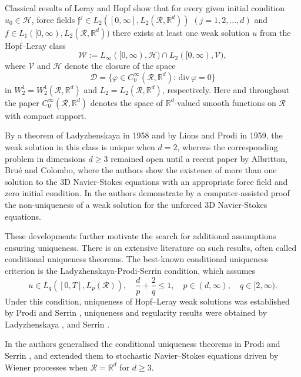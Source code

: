\documentclass[11pt,reqno]{amsart}
\theoremstyle{definition}
\theoremstyle{remark}
\newcommand\bR{\mathbb{R}}
\newcommand\frf{\mathfrak{f}}
\newcommand\cD{\mathcal{D}}
\newcommand\cH{\mathcal{H}}
\newcommand\cR{\mathcal{R}}
\newcommand{\<}{\langle}
\renewcommand{\>}{\rangle}
\newcommand{\R}{\mathbb{R}}
\begin{document}
Classical results of Leray \cite{L1934} and Hopf \cite{H1951} show that for
every given initial condition $u_0\in\mathcal H$, force fields 
$\frf^j\in L_2([0,\infty],L_2(\cR,\bR^d))$ $(j=1,2,...,d)$ and 
$f\in L_1([0,\infty),L_2(\cR,\bR^d))$ there exists at least one weak
solution $u$ from  the Hopf--Leray class
$$
\mathcal W:=L_{\infty}([0,\infty),\mathcal H)
\cap L_2([0,\infty),\mathcal V),
$$
where
$\mathcal V$ and $\cH$ denote the closure of the space 
$$
\cD=\{\varphi\in C^{\infty}_0(\cR,\bR^d): \,\text{div$\,\varphi=0$}\}
$$
in $W^1_2=W^1_2(\cR,\bR^d)$ and $L_2=L_2(\cR,\bR^d)$, respectively. 
Here and throughout the paper  $C^{\infty}_0(\cR,\bR^d)$ denotes the space of $\R^d$-valued 
smooth functions on $\cR$ with compact support. 

By a theorem of Ladyzhenskaya \cite{L1958} in 1958 
and by Lions and Prodi \cite{LionsProdi1959} in 1959,  
the weak solution in this class is unique when
$d=2$,  whereas the corresponding problem in dimensions 
$d\ge3$ remained open until a recent paper \cite{ABC} by  
Albritton, Bru\'e and Colombo,  
 where the authors show the existence of more than one solution 
to the 3D Navier-Stokes equations with an appropriate force field 
and zero initial condition.  In \cite{HouWangYang2026} 
the authors demonstrate by a computer-assisted 
proof the non-uniqueness of a weak solution 
for the unforced  3D Navier-Stokes equations. 

These developments further motivate the search 
for additional assumptions ensuring uniqueness.
There is an extensive literature 
on such results, often called conditional uniqueness theorems. 
The best-known conditional uniqueness criterion 
is the Ladyzhenskaya-Prodi-Serrin condition, which assumes
\begin{equation}
                                                                                       \label{conditionLPS}
u\in L_q([0,T], L_p(\cR)),
\quad \frac{d}{p}+\frac{2}{q}\le1, \quad p\in(d,\infty),\quad q\in[2,\infty). 
\end{equation}
Under this condition, uniqueness of Hopf--Leray weak solutions was established
by Prodi \cite{Prodi1959} and Serrin \cite{Serrin1963}, uniqueness and regularity
results were obtained by Ladyzhenskaya \cite{L1967}, 
 and Serrin \cite{Serrin1963}. 

In 
\cite{GK2026} the authors generalised the conditional uniqueness 
theorems in Prodi \cite{Prodi1959} and Serrin \cite{Serrin1963}, and extended them 
to stochastic Navier--Stokes equations driven by 
Wiener processes when $\cR=\bR^d$ 
for $d\geq3$. 
\end{document}
